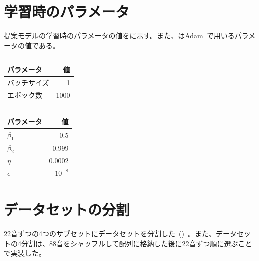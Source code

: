 \appendix
\chapter{学習時のパラメータ}
\label{app:params}

提案モデルの学習時のパラメータの値をに示す。また、はAdam~\cite{Adam}で用いるパラメータの値である。

\begin{table}[h]
\centering
\begin{minipage}{0.49\columnwidth}
    \centering
        \begin{tabular}{lr}\toprule
            パラメータ & 値 \\ \midrule
            バッチサイズ & 1 \\ 
            エポック数 & 1000 \\ \bottomrule
        \end{tabular}
    \caption{}
    \label{tab:params1}
\end{minipage}
\begin{minipage}{0.49\columnwidth}
    \centering
        \begin{tabular}{lr}\toprule
            パラメータ & 値 \\ \midrule
            $\beta_1$ & 0.5 \\
            $\beta_2$ & 0.999 \\
            $\eta$ & 0.0002 \\ 
            $\epsilon$ & $10^{-8}$ \\ \bottomrule
        \end{tabular}
    \caption{}
    \label{tab:params2}
\end{minipage}
\end{table}

\chapter{データセットの分割}
\label{app:split}

22音ずつの4つのサブセットにデータセットを分割した~()~。また、データセットの4分割は、88音をシャッフルして配列に格納した後に22音ずつ順に選ぶことで実装した。

